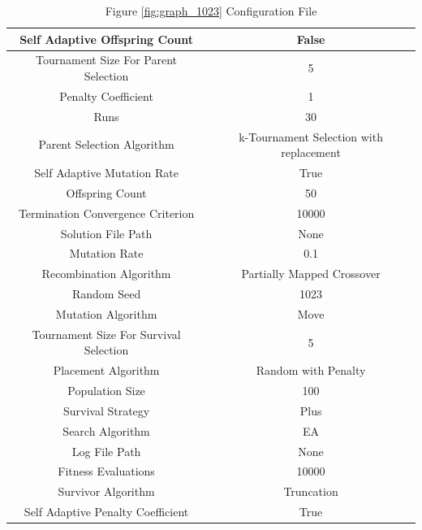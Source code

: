 \documentclass{standalone}
\begin{document}
\begin{table}[!htb]
	\centering
	\caption{Figure \ref{fig:graph_1023} Configuration File}
	\label{tab:graph_1023}
	\begin{tabular}{| c | c |}
		\hline
		Self Adaptive Offspring Count		& False		 \\
		\hline
		Tournament Size For Parent Selection		& 5		 \\
		\hline
		Penalty Coefficient		& 1		 \\
		\hline
		Runs		& 30		 \\
		\hline
		Parent Selection Algorithm		& k-Tournament Selection with replacement		 \\
		\hline
		Self Adaptive Mutation Rate		& True		 \\
		\hline
		Offspring Count		& 50		 \\
		\hline
		Termination Convergence Criterion		& 10000		 \\
		\hline
		Solution File Path		& None		 \\
		\hline
		Mutation Rate		& 0.1		 \\
		\hline
		Recombination Algorithm		& Partially Mapped Crossover		 \\
		\hline
		Random Seed		& 1023		 \\
		\hline
		Mutation Algorithm		& Move		 \\
		\hline
		Tournament Size For Survival Selection		& 5		 \\
		\hline
		Placement Algorithm		& Random with Penalty		 \\
		\hline
		Population Size		& 100		 \\
		\hline
		Survival Strategy		& Plus		 \\
		\hline
		Search Algorithm		& EA		 \\
		\hline
		Log File Path		& None		 \\
		\hline
		Fitness Evaluations		& 10000		 \\
		\hline
		Survivor Algorithm		& Truncation		 \\
		\hline
		Self Adaptive Penalty Coefficient		& True		 \\
		\hline
	\end{tabular}
\end{table}
\end{document}
